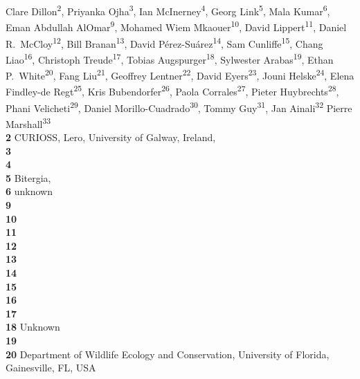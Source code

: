 Clare Dillon\textsuperscript{2},
Priyanka Ojha\textsuperscript{3},
Ian McInerney\textsuperscript{4},
Georg Link\textsuperscript{5},
Mala Kumar\textsuperscript{6},
Eman Abdullah AlOmar\textsuperscript{9},
Mohamed Wiem Mkaouer\textsuperscript{10},
David Lippert\textsuperscript{11},
Daniel R.\ McCloy\textsuperscript{12},
Bill Branan\textsuperscript{13},
David Pérez-Suárez\textsuperscript{14},
Sam Cunliffe\textsuperscript{15},
Chang Liao\textsuperscript{16},
Christoph Treude\textsuperscript{17},
Tobias Augspurger\textsuperscript{18},
Sylwester Arabas\textsuperscript{19},
Ethan P.\ White\textsuperscript{20},
Fang Liu\textsuperscript{21},
Geoffrey Lentner\textsuperscript{22},
David Eyers\textsuperscript{23},
Jouni Helske\textsuperscript{24},
Elena Findley-de Regt\textsuperscript{25},
Kris Bubendorfer\textsuperscript{26},
Paola Corrales\textsuperscript{27},
Pieter Huybrechts\textsuperscript{28},
Phani Velicheti\textsuperscript{29},
Daniel Morillo-Cuadrado\textsuperscript{30},
Tommy Guy\textsuperscript{31},
Jan Ainali\textsuperscript{32}
Pierre Marshall\textsuperscript{33}
\\
\bigskip
\textbf{2} CURIOSS, Lero, University of Galway, Ireland, \\
\textbf{3} \\
\textbf{4} \\
\textbf{5} Bitergia, \\
\textbf{6} unknown\\
\textbf{9} \\
\textbf{10} \\
\textbf{11} \\
\textbf{12} \\
\textbf{13} \\
\textbf{14} \\
\textbf{15} \\
\textbf{16} \\
\textbf{17} \\
\textbf{18} Unknown\\
\textbf{19} \\
\textbf{20} Department of Wildlife Ecology and Conservation, University of Florida, Gainesville, FL, USA \\
